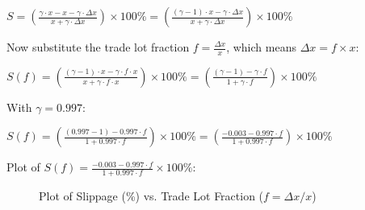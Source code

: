 \documentclass[12pt]{article}
\begin{document}
$S = \left( \frac{\gamma \cdot x - x - \gamma \cdot \Delta x}{x + \gamma \cdot \Delta x} \right) \times 100\% = \left( \frac{(\gamma - 1) \cdot x - \gamma \cdot \Delta x}{x + \gamma \cdot \Delta x} \right) \times 100\%$

Now substitute the trade lot fraction $f = \frac{\Delta x}{x}$, which means $\Delta x = f \times x$:

$S(f) = \left( \frac{(\gamma - 1) \cdot x - \gamma \cdot f \cdot x}{x + \gamma \cdot f \cdot x} \right) \times 100\% = \left( \frac{(\gamma - 1) - \gamma \cdot f}{1 + \gamma \cdot f} \right) \times 100\%$

With $\gamma = 0.997$:

$S(f) = \left( \frac{(0.997 - 1) - 0.997 \cdot f}{1 + 0.997 \cdot f} \right) \times 100\% = \left( \frac{-0.003 - 0.997 \cdot f}{1 + 0.997 \cdot f} \right) \times 100\%$

Plot of $S(f) = \frac{-0.003 - 0.997 \cdot f}{1 + 0.997 \cdot f} \times 100\% $:
\begin{figure}[H]
    \centering
    \caption{Plot of Slippage (\%) vs. Trade Lot Fraction ($f = \Delta x / x$)}
    \label{fig:slippage_fraction}
\end{figure}
\end{document}
